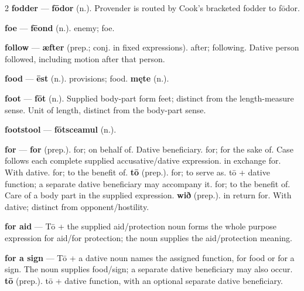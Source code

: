 \begin{multicols}{2}
\textbf{fodder} — \textbf{fōdor} (n.). Provender is routed by Cook's bracketed fodder to fōdor.\par
\textbf{foe} — \textbf{fēond} (n.). enemy; foe.\par
\textbf{follow} — \textbf{æfter} (prep.; conj. in fixed expressions). after; following. Dative person followed, including motion after that person.\par
\textbf{food} — \textbf{ēst} (n.). provisions; food. \textbf{męte} (n.).\par
\textbf{foot} — \textbf{fōt} (n.). Supplied body-part form feet; distinct from the length-measure sense. Unit of length, distinct from the body-part sense.\par
\textbf{footstool} — \textbf{fōtsceamul} (n.).\par
\textbf{for} — \textbf{for} (prep.). for; on behalf of. Dative beneficiary. for; for the sake of. Case follows each complete supplied accusative/dative expression. in exchange for. With dative. for; to the benefit of. \textbf{tō} (prep.). for; to serve as. tō + dative function; a separate dative beneficiary may accompany it. for; to the benefit of. Care of a body part in the supplied expression. \textbf{wið} (prep.). in return for. With dative; distinct from opponent/hostility.\par
\textbf{for aid} — Tō + the supplied aid/protection noun forms the whole purpose expression for aid/for protection; the noun supplies the aid/protection meaning.\par
\textbf{for a sign} — Tō + a dative noun names the assigned function, for food or for a sign. The noun supplies food/sign; a separate dative beneficiary may also occur. \textbf{tō} (prep.). tō + dative function, with an optional separate dative beneficiary.\par

\end{multicols}
